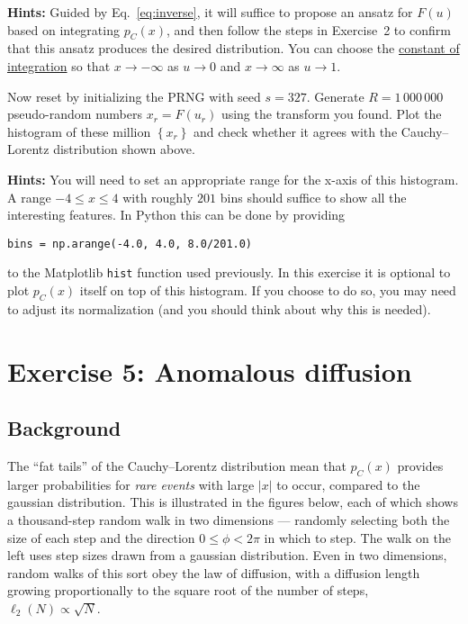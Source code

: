 \documentclass[12 pt]{article} %
\newcommand{\eq}[1]{Eq.~\ref{#1}}
\newcommand{\showmarks}[1]{\rightline{\texttt{[#1 marks]}}} %
\begin{document}
\textbf{Hints:} Guided by \eq{eq:inverse}, it will suffice to propose an ansatz for $F(u)$ based on integrating $p_C(x)$, and then follow the steps in Exercise~2 to confirm that this ansatz produces the desired distribution.
You can choose the \href{https://en.wikipedia.org/wiki/Constant_of_integration}{constant of integration} so that $x \to -\infty$ as $u \to 0$ and $x \to \infty$ as $u \to 1$.

\showmarks{6}

Now reset by initializing the PRNG with seed $s = 327$.
Generate $R = 1\,000\,000$ pseudo-random numbers $x_r = F(u_r)$ using the transform you found.
Plot the histogram of these million $\left\{x_r\right\}$ and check whether it agrees with the Cauchy--Lorentz distribution shown above.

\textbf{Hints:} You will need to set an appropriate range for the x-axis of this histogram.
A range $-4 \leq x \leq 4$ with roughly $201$ bins should suffice to show all the interesting features.
In Python this can be done by providing \\
\centerline{\texttt{bins = np.arange(-4.0, 4.0, 8.0/201.0)}}
to the Matplotlib \texttt{hist} function used previously.
In this exercise it is optional to plot $p_C(x)$ itself on top of this histogram.
If you choose to do so, you may need to adjust its normalization (and you should think about why this is needed).

\showmarks{8}



\newpage %
\section*{Exercise 5: Anomalous diffusion}
\subsection*{Background}
The ``fat tails'' of the Cauchy--Lorentz distribution mean that $p_C(x)$ provides larger probabilities for \textit{rare events} with large $|x|$ to occur, compared to the gaussian distribution.
This is illustrated in the figures below, each of which shows a thousand-step random walk in two dimensions --- randomly selecting both the size of each step and the direction $0 \leq \phi < 2\pi$ in which to step.
The walk on the left uses step sizes drawn from a gaussian distribution.
Even in two dimensions, random walks of this sort obey the law of diffusion, with a diffusion length growing proportionally to the square root of the number of steps, $\ell_2(N) \propto \sqrt{N}$.
\end{document}
